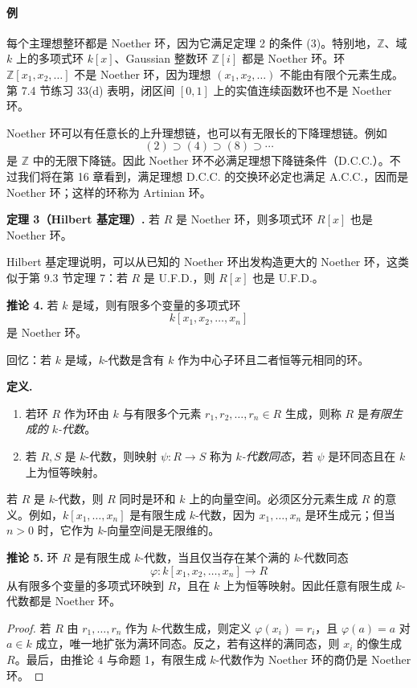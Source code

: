 \paragraph{例}
每个主理想整环都是 Noether 环，因为它满足定理 2 的条件 (3)。特别地，$\mathbb Z$、域 $k$ 上的多项式环 $k[x]$、Gaussian 整数环 $\mathbb Z[i]$ 都是 Noether 环。环 $\mathbb Z[x_1,x_2,\ldots]$ 不是 Noether 环，因为理想 $(x_1,x_2,\ldots)$ 不能由有限个元素生成。第 7.4 节练习 33(d) 表明，闭区间 $[0,1]$ 上的实值连续函数环也不是 Noether 环。

Noether 环可以有任意长的上升理想链，也可以有无限长的下降理想链。例如
\[
(2)\supset (4)\supset (8)\supset\cdots
\]
是 $\mathbb Z$ 中的无限下降链。因此 Noether 环不必满足理想下降链条件（D.C.C.）。不过我们将在第 16 章看到，满足理想 D.C.C. 的交换环必定也满足 A.C.C.，因而是 Noether 环；这样的环称为 Artinian 环。

\noindent\textbf{定理 3（Hilbert 基定理）.} 若 $R$ 是 Noether 环，则多项式环 $R[x]$ 也是 Noether 环。

Hilbert 基定理说明，可以从已知的 Noether 环出发构造更大的 Noether 环，这类似于第 9.3 节定理 7：若 $R$ 是 U.F.D.，则 $R[x]$ 也是 U.F.D.。

\noindent\textbf{推论 4.} 若 $k$ 是域，则有限多个变量的多项式环
\[
k[x_1,x_2,\ldots,x_n]
\]
是 Noether 环。

回忆：若 $k$ 是域，$k$-代数是含有 $k$ 作为中心子环且二者恒等元相同的环。

\noindent\textbf{定义.}
\begin{enumerate}[label=(\arabic*)]
	\item 若环 $R$ 作为环由 $k$ 与有限多个元素 $r_1,r_2,\ldots,r_n\in R$ 生成，则称 $R$ 是\emph{有限生成的 $k$-代数}。
	\item 若 $R,S$ 是 $k$-代数，则映射 $\psi:R\to S$ 称为 \emph{$k$-代数同态}，若 $\psi$ 是环同态且在 $k$ 上为恒等映射。
\end{enumerate}

若 $R$ 是 $k$-代数，则 $R$ 同时是环和 $k$ 上的向量空间。必须区分元素生成 $R$ 的意义。例如，$k[x_1,\ldots,x_n]$ 是有限生成 $k$-代数，因为 $x_1,\ldots,x_n$ 是环生成元；但当 $n>0$ 时，它作为 $k$-向量空间是无限维的。

\noindent\textbf{推论 5.} 环 $R$ 是有限生成 $k$-代数，当且仅当存在某个满的 $k$-代数同态
\[
\varphi:k[x_1,x_2,\ldots,x_n]\longrightarrow R
\]
从有限多个变量的多项式环映到 $R$，且在 $k$ 上为恒等映射。因此任意有限生成 $k$-代数都是 Noether 环。

\begin{proof}
	若 $R$ 由 $r_1,\ldots,r_n$ 作为 $k$-代数生成，则定义 $\varphi(x_i)=r_i$，且 $\varphi(a)=a$ 对 $a\in k$ 成立，唯一地扩张为满环同态。反之，若有这样的满同态，则 $x_i$ 的像生成 $R$。最后，由推论 4 与命题 1，有限生成 $k$-代数作为 Noether 环的商仍是 Noether 环。
\end{proof}

